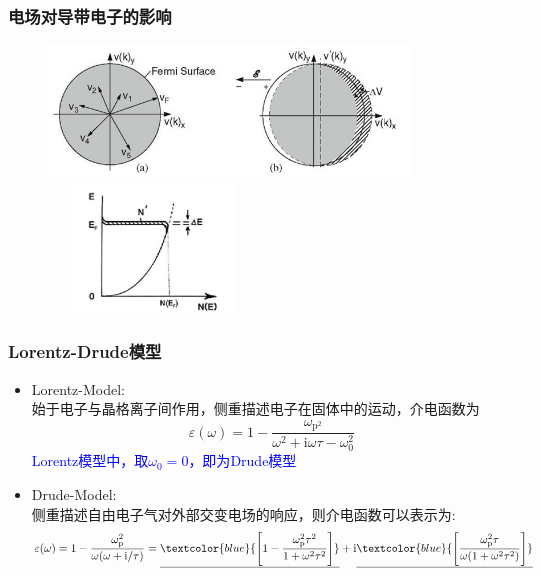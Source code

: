 {\frame
{
	\frametitle{电场对导带电子的影响}
\begin{figure}[h!]
\centering
\vspace*{-13pt}
\includegraphics[height=1.4in,width=3.8in,viewport=0 0 480 180,clip]{Figures/Electrmagnetic_Fermi-surface-1.jpg}
\includegraphics[height=1.35in,width=2.2in,viewport=0 0 200 130,clip]{Figures/Electrmagnetic_Fermi-surface-2.jpg}
\caption{\fontsize{5.5pt}{4.2pt}}%
\label{CB-Electron-in-E}
\end{figure} 
}

\frame
{
	\frametitle{\textrm{Lorentz-Drude}模型}
\begin{itemize}
	\item \textrm{Lorentz-Model}:\\
		始于电子与晶格离子间作用，侧重描述电子在固体中的运动，介电函数为
		\begin{displaymath}
			\varepsilon(\omega)=1-\dfrac{\omega_{\mathrm{p}^2}}{\omega^2+\mathrm{i}\omega\tau-\omega_0^2}
		\end{displaymath}
		\textcolor{blue}{\textrm{Lorentz}模型中，取$\omega_0=0$，即为\textrm{Drude}模型}
	\item \textrm{Drude-Model}:\\
		侧重描述自由电子气对外部交变电场的响应，则介电函数可以表示为:
			\begin{displaymath}
				\varepsilon(\omega)=1-\frac{\omega_\mathrm{p}^2}{\omega(\omega+\mathrm{i}/\tau)}=\underline{\textcolor{blue}{\left[ 1-\frac{\omega_{\mathrm{p}}^2\tau^2}{1+\omega^2\tau^2} \right]}}+\mathrm{i}\underline{\textcolor{blue}{\left[ \frac{\omega_{\mathrm{p}}^2\tau}{\omega(1+\omega^2\tau^2)} \right]}}
			\end{displaymath}
\end{itemize}
}

}
